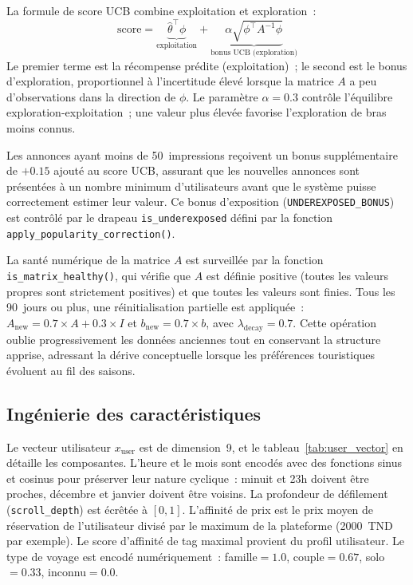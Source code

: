 La formule de score UCB combine exploitation et exploration~:
\begin{equation}
    \text{score} = \underbrace{\hat{\theta}^\top \phi}_{\text{exploitation}} +
    \underbrace{\alpha \sqrt{\phi^\top A^{-1} \phi}}_{\text{bonus UCB (exploration)}}
    \label{eq:ucb_score}
\end{equation}
Le premier terme est la récompense prédite (exploitation)~; le second est le bonus d'exploration,
proportionnel à l'incertitude   élevé lorsque la matrice $A$ a peu d'observations dans la
direction de $\phi$. Le paramètre $\alpha = 0.3$ contrôle l'équilibre exploration-exploitation~;
une valeur plus élevée favorise l'exploration de bras moins connus.

Les annonces ayant moins de 50~impressions reçoivent un bonus supplémentaire de $+0.15$ ajouté
au score UCB, assurant que les nouvelles annonces sont présentées à un nombre minimum
d'utilisateurs avant que le système puisse correctement estimer leur valeur. Ce bonus
d'exposition (\texttt{UNDEREXPOSED\_BONUS}) est contrôlé par le drapeau
\texttt{is\_underexposed} défini par la fonction \texttt{apply\_popularity\_correction()}.

La santé numérique de la matrice $A$ est surveillée par la fonction \texttt{is\_matrix\_healthy()},
qui vérifie que $A$ est définie positive (toutes les valeurs propres sont strictement positives)
et que toutes les valeurs sont finies. Tous les 90~jours ou plus, une réinitialisation partielle est
appliquée~: $A_{\text{new}} = 0.7 \times A + 0.3 \times I$ et $b_{\text{new}} = 0.7 \times b$,
avec $\lambda_{\text{decay}} = 0.7$. Cette opération oublie progressivement les données anciennes
tout en conservant la structure apprise, adressant la dérive conceptuelle lorsque les préférences
touristiques évoluent au fil des saisons.


\subsection{Ingénierie des caractéristiques}

Le vecteur utilisateur $x_{\text{user}}$ est de dimension~9, et le tableau~\ref{tab:user_vector} en détaille les composantes. L'heure et le mois sont encodés
avec des fonctions sinus et cosinus pour préserver leur nature cyclique~: minuit et 23h doivent
être proches, décembre et janvier doivent être voisins. La profondeur de défilement
(\texttt{scroll\_depth}) est écrêtée à $[0, 1]$.
L'affinité de prix est le prix moyen de réservation de l'utilisateur divisé par le maximum de la
plateforme (2000~TND par exemple). Le score d'affinité de tag maximal provient du profil utilisateur. Le
type de voyage est encodé numériquement~: famille$=1.0$, couple$=0.67$, solo$=0.33$,
inconnu$=0.0$.

